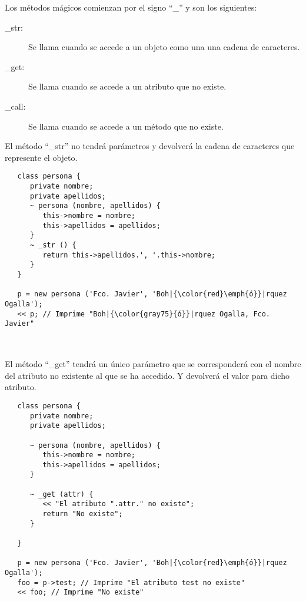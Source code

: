 Los métodos mágicos comienzan por el signo ``\_'' y son los siguientes: 

\begin{description}
\item[\_str:] Se llama cuando se accede a un objeto como una una cadena de caracteres.
\item[\_get:] Se llama cuando se accede a un atributo que no existe.
\item[\_call:] Se llama cuando se accede a un método que no existe.
\end{description}

El método ``\_str'' no tendrá parámetros y devolverá la cadena de caracteres que
represente el objeto. \\

\begin{lstlisting}
   class persona {
      private nombre;
      private apellidos;
      ~ persona (nombre, apellidos) {
         this->nombre = nombre;
         this->apellidos = apellidos;
      }
      ~ _str () {
         return this->apellidos.', '.this->nombre;
      }
   }
   
   p = new persona ('Fco. Javier', 'Boh|{\color{red}\emph{ó}}|rquez Ogalla');
   << p; // Imprime "Boh|{\color{gray75}{ó}}|rquez Ogalla, Fco. Javier"
   
\end{lstlisting}
\hfill\\ 

El método ``\_get'' tendrá un único parámetro que se corresponderá con 
el nombre del atributo no existente al que se ha accedido. Y devolverá 
el valor para dicho atributo. \\

\begin{lstlisting}
   class persona {
      private nombre;
      private apellidos;
      
      ~ persona (nombre, apellidos) {
         this->nombre = nombre;
         this->apellidos = apellidos;
      }
      
      ~ _get (attr) {
         << "El atributo ".attr." no existe";
         return "No existe";
      }
      
   }
   
   p = new persona ('Fco. Javier', 'Boh|{\color{red}\emph{ó}}|rquez Ogalla');
   foo = p->test; // Imprime "El atributo test no existe"
   << foo; // Imprime "No existe"
\end{lstlisting}
\hfill\\ 

